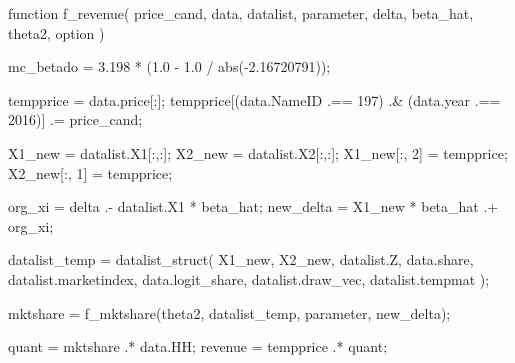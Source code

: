 \documentclass[
  letterpaper,
  DIV=11,
  numbers=noendperiod]{scrreprt}
\newenvironment{Shaded}{\begin{snugshade}}{\end{snugshade}}
\newcommand{\FloatTok}[1]{\textcolor[rgb]{0.68,0.00,0.00}{#1}}
\newcommand{\FunctionTok}[1]{\textcolor[rgb]{0.28,0.35,0.67}{#1}}
\newcommand{\KeywordTok}[1]{\textcolor[rgb]{0.00,0.23,0.31}{#1}}
\newcommand{\NormalTok}[1]{\textcolor[rgb]{0.00,0.23,0.31}{#1}}
\newcommand{\OperatorTok}[1]{\textcolor[rgb]{0.37,0.37,0.37}{#1}}
\begin{document}
\begin{Shaded}
\begin{Highlighting}[]
\KeywordTok{function} \FunctionTok{f\_revenue}\NormalTok{(}
\NormalTok{        price\_cand,}
\NormalTok{        data,}
\NormalTok{        datalist,}
\NormalTok{        parameter,}
\NormalTok{        delta,}
\NormalTok{        beta\_hat,}
\NormalTok{        theta2,}
\NormalTok{        option}
\NormalTok{    )}

\NormalTok{    mc\_betado }\OperatorTok{=} \FloatTok{3.198} \OperatorTok{*}\NormalTok{ (}\FloatTok{1.0} \OperatorTok{{-}} \FloatTok{1.0} \OperatorTok{/} \FunctionTok{abs}\NormalTok{(}\OperatorTok{{-}}\FloatTok{2.16720791}\NormalTok{));}

\NormalTok{    tempprice }\OperatorTok{=}\NormalTok{ data.price[}\OperatorTok{:}\NormalTok{];}
\NormalTok{    tempprice[(data.NameID }\OperatorTok{.==} \FloatTok{197}\NormalTok{) }\OperatorTok{.\&}\NormalTok{ (data.year }\OperatorTok{.==} \FloatTok{2016}\NormalTok{)] }\OperatorTok{.=}\NormalTok{ price\_cand;}
    
\NormalTok{    X1\_new }\OperatorTok{=}\NormalTok{ datalist.X1[}\OperatorTok{:}\NormalTok{,}\OperatorTok{:}\NormalTok{];}
\NormalTok{    X2\_new }\OperatorTok{=}\NormalTok{ datalist.X2[}\OperatorTok{:}\NormalTok{,}\OperatorTok{:}\NormalTok{];}
\NormalTok{    X1\_new[}\OperatorTok{:}\NormalTok{, }\FloatTok{2}\NormalTok{] }\OperatorTok{=}\NormalTok{ tempprice;}
\NormalTok{    X2\_new[}\OperatorTok{:}\NormalTok{, }\FloatTok{1}\NormalTok{] }\OperatorTok{=}\NormalTok{ tempprice;}
    
\NormalTok{    org\_xi }\OperatorTok{=}\NormalTok{ delta }\OperatorTok{.{-}}\NormalTok{ datalist.X1 }\OperatorTok{*}\NormalTok{ beta\_hat;}
\NormalTok{    new\_delta }\OperatorTok{=}\NormalTok{ X1\_new }\OperatorTok{*}\NormalTok{ beta\_hat }\OperatorTok{.+}\NormalTok{ org\_xi;}
    
\NormalTok{    datalist\_temp }\OperatorTok{=} \FunctionTok{datalist\_struct}\NormalTok{(}
\NormalTok{        X1\_new, X2\_new, datalist.Z, data.share, datalist.marketindex, }
\NormalTok{        data.logit\_share, datalist.draw\_vec, datalist.tempmat}
\NormalTok{        );}
    
\NormalTok{    mktshare }\OperatorTok{=} \FunctionTok{f\_mktshare}\NormalTok{(theta2, datalist\_temp, parameter, new\_delta);}
    
\NormalTok{    quant }\OperatorTok{=}\NormalTok{ mktshare }\OperatorTok{.*}\NormalTok{ data.HH;}
\NormalTok{    revenue }\OperatorTok{=}\NormalTok{ tempprice }\OperatorTok{.*}\NormalTok{ quant;}
        

\end{Highlighting}
\end{Shaded}
\end{document}
